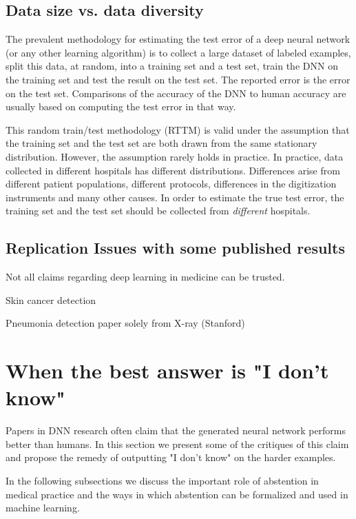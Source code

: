 \documentclass[fleqn,10pt]{wlscirep}
\begin{document}


\subsection*{Data size vs. data diversity}
The prevalent methodology for estimating the test error of a deep neural network (or any other learning algorithm) is to 
collect a large dataset of labeled examples, split this data, at random, into a training set and a test set, train the DNN on the training set and test the result on the test set. The reported error is the error on the test set. Comparisons of the accuracy of the DNN to human accuracy are usually based on computing the test error in that way.

This random train/test methodology (RTTM) is valid under the assumption that the training set and the test set are both drawn 
from the same stationary distribution. However, the assumption rarely holds in practice. In practice, data collected in different hospitals has different distributions. Differences arise from different patient populations, different protocols, differences in the digitization instruments and many other causes. In order to estimate the true test error, the training set and the test set should be collected from {\em different} hospitals.


\subsection*{Replication Issues with some published results}
Not all claims regarding deep learning in medicine can be trusted.

Skin cancer detection~\cite{esteva2017dermatologist}

Pneumonia detection paper solely from X-ray (Stanford)

\section{When the best answer is "I don't know"}

Papers in DNN research often claim that the generated neural network performs better than humans. In this section we present some of the critiques of this claim and propose the remedy of outputting "I don't know" on the harder examples.

In the following subsections we discuss the important role of abstention in medical practice and the ways in which abstention can be formalized and used in machine learning.
\end{document}
